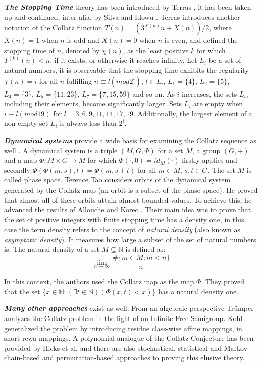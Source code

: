 \par\medskip
\textit{\textbf{The Stopping Time}} theory has been introduced by Terras \cite{Ref_Terras_1976}, it has been taken up and continued, inter alia, by Silva \cite{Ref_Silva_1999} and Idowu \cite{Ref_Idowu_2015}. Terras introduces another notation of the Collatz function $T(n)=(3^{X(n)}n+X(n))/2$, where $X(n)=1$ when $n$ is odd and $X(n)=0$ when $n$ is even, and defined the stopping time of $n$, denoted by $\chi(n)$, as the least positive $k$ for which $T^{(k)}(n)<n$, if it exists, or otherwise it reaches infinity. Let $L_i$ be a set of natural numbers, it is observable that the stopping time exhibits the regularity $\chi(n)=i$ for all $n$ fulfilling $n\equiv l(mod 2^i)$, $l\in L_i$, $L_1=\{4\}$, $L_2=\{5\}$, $L_4=\{3\}$, $L_5=\{11,23\}$, $L_7=\{7,15,59\}$ and so on. As $i$ increases, the sets $L_i$, including their elements, become significantly larger. Sets $L_i$ are empty when $i\equiv l(mod 19)$ for $l=3,6,9,11,14,17,19$. Additionally, the largest element of a non-empty set $L_i$ is always less than $2^i$.

\par\medskip
\textit{\textbf{Dynamical systems}} provide a wide basis for examining the Collatz sequence as well \cite{Ref_Wirsching_1998}. A dynamical system \cite[p.~464]{Ref_Walz_2017} is a triple $(M,G,\Phi)$ for a set $M$, a group $(G,+)$ and a map $\Phi:M\times G\to M$ for which $\Phi(\cdot,0)=id_M(\cdot)$ firstly applies and secondly $\Phi\left(\Phi(m,s),t\right)=\Phi(m,s+t)$ for all $m\in M$, $s,t\in G$. The set $M$ is called phase space. Terence Tao \cite{Ref_Tao_2019} considers orbits of the dynamical system generated by the Collatz map (an orbit is a subset of the phase space). He proved that almost all of these orbits attain almost bounded values. To achieve this, he advanced the results of Allouche \cite{Ref_Allouche_1978} and Korec \cite{Ref_Korec_1994}. Their main idea was to prove that the set of positive integers with finite stopping time has a density one, in this case the term density refers to the concept of \textit{natural density} (also known as \textit{asymptotic density}). It measures how large a subset of the set of natural numbers is. The natural density of a set $M\subseteq\mathbb{N}$ is defined as:
\[
\lim_{n\to\infty}\frac{\#\{m\in M:m<n\}}{n}
\]

In this context, the authors used the Collatz map as the map $\Phi$. They proved that the set $\{x\in\mathbb{N}:(\exists t\in\mathbb{N})(\Phi(x,t)<x)\}$ has a natural density one.

\par\medskip
\textit{\textbf{Many other approaches}} exist as well. From an algebraic perspective Trümper \cite{Ref_Truemper_2014} analyzes the Collatz problem in the light of an Infinite Free Semigroup. Kohl \cite{Ref_Kohl_2008} generalized the problem by introducing residue class-wise affine mappings, in short rcwa mappings. A polynomial analogue of the Collatz Conjecture has been provided by Hicks et al. \cite{Ref_Hicks_Mullen_Yucas_Zavislak_2008} \cite{Ref_Snapp_Tracy_2008} and there are also stochastical, statistical and Markov chain-based and permutation-based approaches to proving this elusive theory.
